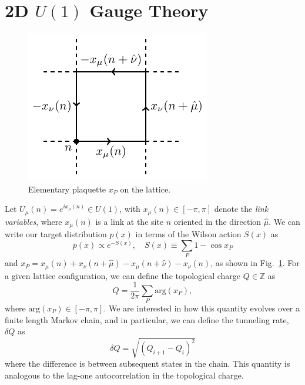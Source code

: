 \documentclass[a4paper,11pt]{article}
\begin{document}
\section{%
    \label{sec:gauge_theory}%
    2D \texorpdfstring{\(U(1)\)}{U(1)} Gauge Theory
}
%
\begin{figure}
  \includegraphics[width=0.33\columnwidth]{assets/plaq.pdf}
  \caption{\label{fig:plaq} Elementary plaquette \(x_{P}\) on the lattice.}
\end{figure}
%
Let \(U_{\mu}(n) = e^{i x_{\mu}(n)}\in U(1)\), with \(x_{\mu}(n)\in [-\pi,
\pi]\) denote the \emph{link variables}, where \(x_{\mu}(n)\) is a link at the
site \(n\) oriented in the direction \(\hat{\mu}\).
%
We can write our target distribution \(p(x)\) in terms of the Wilson action
\(S(x)\) as
%
\begin{equation}
    p(x)\propto e^{-S(x)},\quad S(x) \equiv \sum_{P} 1 - \cos x_{P}
\end{equation}
%
and \(x_{P} = x_{\mu}(n) + x_{\nu}(n+\hat{\mu}) - x_{\mu}(n+\hat{\nu}) -
x_{\nu}(n)\), as shown in Fig.~\ref{fig:plaq}.
%
For a given lattice configuration, we can define the topological charge
\(Q\in\mathbb{Z}\) as
%
\begin{equation}
    Q = \frac{1}{2\pi}\sum_{P}\mathrm{arg}(x_{P}),
\end{equation}
%
where \(\mathrm{arg}(x_{P})\in[-\pi,\pi]\).
%
We are interested in how this quantity evolves over a finite length Markov
chain, and in particular, we can define the tunneling rate, \(\delta Q\) as
%
\begin{equation}
    \delta Q = \sqrt{\left(Q_{i+1} - Q_{i}\right)^{2}}
\end{equation}
%
where the difference is between subsequent states in the chain.
%
This quantity is analogous to the lag-one autocorrelation in the topological
charge.
%
\end{document}
